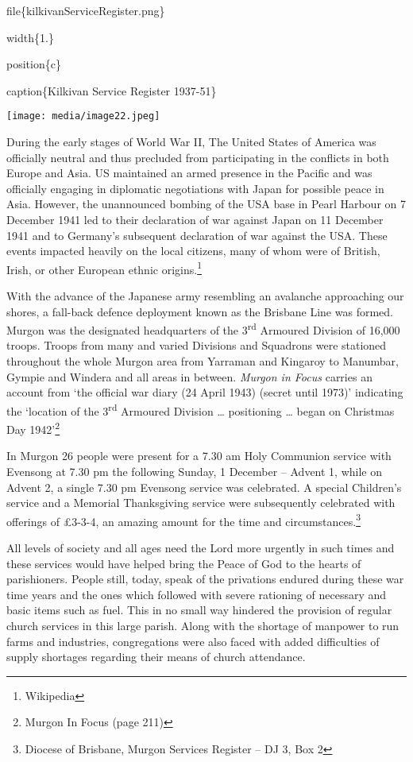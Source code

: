 file\{kilkivanServiceRegister.png\}

width\{1.\}

position\{c\}

caption\{Kilkivan Service Register 1937-51\}

\texttt{[image: media/image22.jpeg]}

During the early stages of World War II, The United States of America was officially neutral and thus precluded from participating in the conflicts in both Europe and Asia. US maintained an armed presence in the Pacific and was officially engaging in diplomatic negotiations with Japan for possible peace in Asia. However, the unannounced bombing of the USA base in Pearl Harbour on 7 December 1941 led to their declaration of war against Japan on 11 December 1941 and to Germany's subsequent declaration of war against the USA. These events impacted heavily on the local citizens, many of whom were of British, Irish, or other European ethnic origins.\footnote{Wikipedia}

With the advance of the Japanese army resembling an avalanche approaching our shores, a fall-back defence deployment known as the Brisbane Line was formed. Murgon was the designated headquarters of the 3\textsuperscript{rd} Armoured Division of 16,000 troops. Troops from many and varied Divisions and Squadrons were stationed throughout the whole Murgon area from Yarraman and Kingaroy to Manumbar, Gympie and Windera and all areas in between. \emph{Murgon in Focus} carries an account from `the official war diary (24 April 1943) (secret until 1973)' indicating the `location of the 3\textsuperscript{rd} Armoured Division \ldots{} positioning \ldots{} began on Christmas Day 1942'\footnote{Murgon In Focus (page 211)}

In Murgon 26 people were present for a 7.30 am Holy Communion service with Evensong at 7.30 pm the following Sunday, 1 December -- Advent 1, while on Advent 2, a single 7.30 pm Evensong service was celebrated. A special Children's service and a Memorial Thanksgiving service were subsequently celebrated with offerings of £3-3-4, an amazing amount for the time and circumstances.\footnote{Diocese of Brisbane, Murgon Services Register -- DJ 3, Box 2}

All levels of society and all ages need the Lord more urgently in such times and these services would have helped bring the Peace of God to the hearts of parishioners. People still, today, speak of the privations endured during these war time years and the ones which followed with severe rationing of necessary and basic items such as fuel. This in no small way hindered the provision of regular church services in this large parish. Along with the shortage of manpower to run farms and industries, congregations were also faced with added difficulties of supply shortages regarding their means of church attendance.

